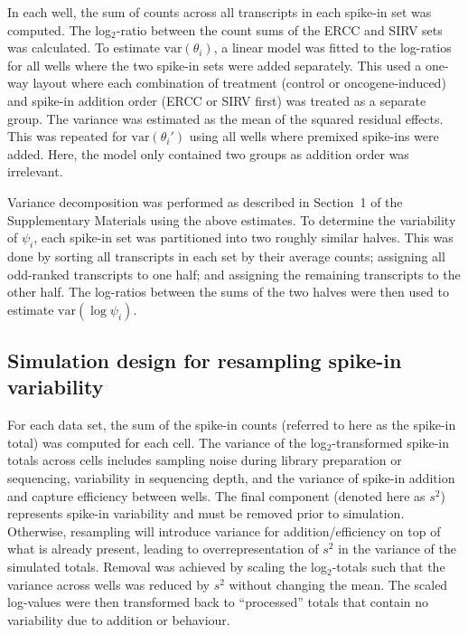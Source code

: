 \documentclass{article}
\begin{document}
In each well, the sum of counts across all transcripts in each spike-in set was computed.
The log$_2$-ratio between the count sums of the ERCC and SIRV sets was calculated.
To estimate $\mbox{var}(\theta_i)$, a linear model was fitted to the log-ratios for all wells where the two spike-in sets were added separately.
This used a one-way layout where each combination of treatment (control or oncogene-induced) and spike-in addition order (ERCC or SIRV first) was treated as a separate group.
The variance was estimated as the mean of the squared residual effects.
This was repeated for $\mbox{var}(\theta_i')$ using all wells where premixed spike-ins were added.
Here, the model only contained two groups as addition order was irrelevant.

Variance decomposition was performed as described in Section~1 of the Supplementary Materials using the above estimates.
To determine the variability of $\psi_i$, each spike-in set was partitioned into two roughly similar halves.
This was done by sorting all transcripts in each set by their average counts; assigning all odd-ranked transcripts to one half; and assigning the remaining transcripts to the other half.
The log-ratios between the sums of the two halves were then used to estimate $\mbox{var}(\log \psi_i)$.

\subsection{Simulation design for resampling spike-in variability}
For each data set, the sum of the spike-in counts (referred to here as the spike-in total) was computed for each cell.
The variance of the log$_2$-transformed spike-in totals across cells includes sampling noise during library preparation or sequencing, variability in sequencing depth, and the variance of spike-in addition and capture efficiency between wells.
The final component (denoted here as $s^2$) represents spike-in variability and must be removed prior to simulation.
Otherwise, resampling will introduce variance for addition/efficiency on top of what is already present, leading to overrepresentation of $s^2$ in the variance of the simulated totals.
Removal was achieved by scaling the log$_2$-totals such that the variance across wells was reduced by $s^2$ without changing the mean.
The scaled log-values were then transformed back to ``processed'' totals that contain no variability due to addition or behaviour.
\end{document}
